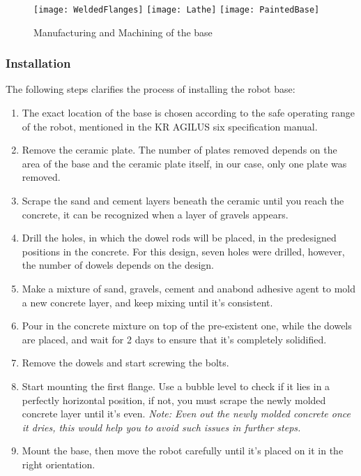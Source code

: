 \begin{figure}[H]
\begin{center}
	\texttt{[image: WeldedFlanges]}
	\texttt{[image: Lathe]}
	\texttt{[image: PaintedBase]}
	\caption{Manufacturing and Machining of the base}
\end{center}
\end{figure}

\subsubsection{Installation}

The following steps clarifies the process of installing the robot base:
\begin{enumerate}
	\item The exact location of the base is chosen according to the safe operating range of the robot, mentioned in the KR AGILUS six specification manual.
	\item Remove the ceramic plate. The number of plates removed depends on the area of the base and the ceramic plate itself, in our case, only one plate was removed.
	\item Scrape the sand and cement layers beneath the ceramic until you reach the concrete, it can be recognized when a layer of gravels appears.
	\item Drill the holes, in which the dowel rods will be placed, in the predesigned positions in the concrete. For this design, seven holes were drilled, however, the number of dowels depends on the design.
	\item Make a mixture of sand, gravels, cement and anabond adhesive agent to mold a new concrete layer, and keep mixing until it’s consistent.
	\item Pour in the concrete mixture on top of the pre-existent one, while the dowels are placed, and wait for 2 days to ensure that it’s completely solidified.
	\item Remove the dowels and start screwing the bolts.
    \item Start mounting the first flange. Use a bubble level to check if it lies in a perfectly horizontal position, if not, you must scrape the newly molded concrete layer until it’s even. 
	\textit{\newline Note: Even out the newly molded concrete once it dries, this would help you to avoid such issues in further steps.}
	\item Mount the base, then move the robot carefully until it’s placed on it in the right orientation.
\end{enumerate}

